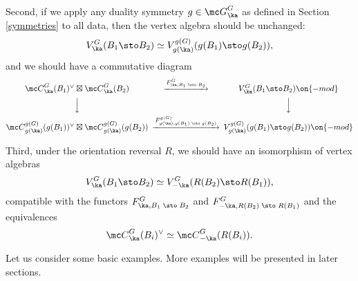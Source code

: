 \documentclass[11pt,reqno]{amsart}
\theoremstyle{plain}
\numberwithin{equation}{section}
\theoremstyle{definition}
\begin{document}
Second, if we apply any duality symmetry $g \in {\mc G}^G_\ka$ as
defined in Section \ref{symmetries} to all data, then the vertex
algebra should be unchanged:
\begin{equation}    \label{g junction}
V^G_\ka(B_1\sto B_2) \simeq V^{g(G)}_{g(\ka)}(g(B_1)\sto g(B_2)),
\end{equation}
and we should have a commutative diagram
\begin{equation}    \label{compat}
\begin{CD}
{\mc C}^G_\ka(B_1)^\vee \boxtimes {\mc
  C}^G_\ka(B_2) @>{F^G_{\ka,B_1\; \sto \; B_2}}>>
V^G_\ka(B_1\sto B_2)\on{-mod} \\
@VVV @VVV \\
{\mc C}^{g(G)}_{g(\ka)}(g(B_1))^\vee \boxtimes {\mc
  C}^{g(G)}_{g(\ka)}(g(B_2))  @>{F^{g(G)}_{g(\ka),g(B_1)\; \sto \; g(B_2)}}>>
V^{g(G)}_{g(\ka)}(g(B_1)\sto g(B_2))\on{-mod}
\end{CD}
\end{equation}

Third, under the orientation reversal $R$, we should have an
isomorphism of vertex algebras
\begin{equation}   \label{R junction}
V^G_\ka(B_1\sto B_2) \simeq V^G_{-\ka}(R(B_2)\sto R(B_1)),
\end{equation}
compatible with the functors $F^G_{\ka,B_1\; \sto \; B_2}$ and
$F^G_{-\ka,R(B_2)\; \sto \; R(B_1)}$ and the equivalences
$$
{\mc C}^G_\ka(B_i)^\vee \simeq {\mc C}^G_{-\ka}(R(B_i)).
$$

Let us consider some basic examples. More examples will be presented
in later sections.

\bigskip
\end{document}
